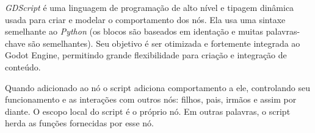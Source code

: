 \textit{GDScript} é uma linguagem de programação de alto nível e tipagem 
dinâmica usada para criar e modelar o comportamento dos nós.
Ela usa uma sintaxe semelhante ao \textit{Python} (os blocos são 
baseados em identação e muitas palavras-chave são semelhantes). 
Seu objetivo é ser otimizada e fortemente integrada ao Godot Engine, permitindo
grande flexibilidade para criação e integração de conteúdo.

Quando adicionado ao nó o script adiciona comportamento a ele, controlando seu
funcionamento e as interações com outros nós: filhos, pais, irmãos e assim por 
diante. O escopo local do script é o próprio nó. Em outras palavras, o script 
herda as funções fornecidas por esse nó.